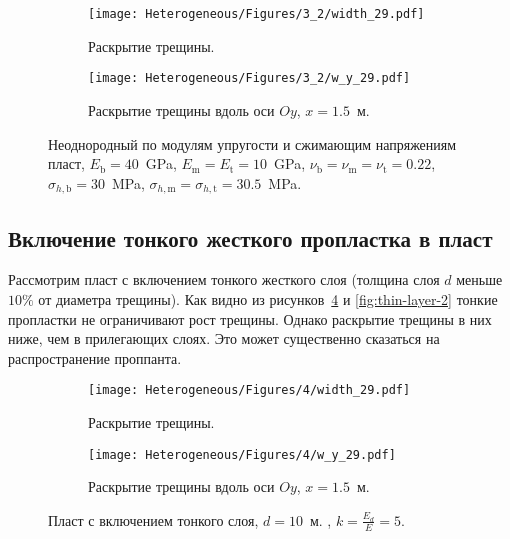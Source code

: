 \begin{figure}[htbp]
    \centering
    \begin{subfigure}[t]{0.4\textwidth}
        \centering
        \texttt{[image: Heterogeneous/Figures/3\_2/width\_29.pdf]}
        \caption{Раскрытие трещины.}
        \label{fig:comparison-2-planar}
    \end{subfigure}
    \hfill 
    \begin{subfigure}[t]{0.55\textwidth}
        \centering
        \texttt{[image: Heterogeneous/Figures/3\_2/w\_y\_29.pdf]}
        \caption{Раскрытие трещины вдоль оси $Oy$, $x=1.5$~м.}
        \label{fig:comparison-2-slice}
    \end{subfigure}
    \caption{Неоднородный по модулям упругости и сжимающим напряжениям пласт, $E_\text{b} = 40$~GPa, $E_\text{m} = E_\text{t} = 10$~GPa, $\nu_\text{b} = \nu_\text{m} = \nu_\text{t} = 0.22$, $\sigma_{h,\text{b}} = 30$~MPa, $\sigma_{h,\text{m}} = \sigma_{h,\text{t}} = 30.5$~MPa.}
    \label{fig:comparison-2}
\end{figure}


\subsection{Включение тонкого жесткого пропластка в пласт}
Рассмотрим пласт с включением тонкого жесткого слоя (толщина слоя $d$ меньше $10\%$ от диаметра трещины). Как видно из рисунков~\ref{fig:thin-layer-1} и \ref{fig:thin-layer-2} тонкие пропластки не ограничивают рост трещины. Однако раскрытие трещины в них ниже, чем в прилегающих слоях. Это может существенно сказаться на распространение проппанта. 
\begin{figure}[htbp]
    \centering
    \begin{subfigure}[t]{0.4\textwidth}
        \centering
        \texttt{[image: Heterogeneous/Figures/4/width\_29.pdf]}
        \caption{Раскрытие трещины.}
    \end{subfigure}
    \hfill 
    \begin{subfigure}[t]{0.55\textwidth}
        \centering
        \texttt{[image: Heterogeneous/Figures/4/w\_y\_29.pdf]}
        \caption{Раскрытие трещины вдоль оси $Oy$, $x=1.5$~м.}
    \end{subfigure}
    \caption{Пласт с включением тонкого слоя, $d=10$~м. , $k=\frac{E_d}{E}=5$.}
    \label{fig:thin-layer-1}
\end{figure}

